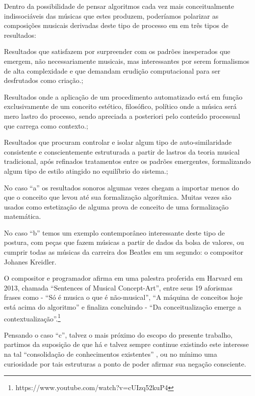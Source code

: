 \documentclass[
	12pt,				%
	openright,			%
	twoside,			%
	a4paper,			%
	english,			%
	french,				%
	spanish,			%
	brazil				%
	]{abntex2}
\begin{document}
Dentro da possibilidade de pensar algoritmos cada vez mais conceitualmente indissociáveis das músicas que estes produzem, poderíamos polarizar as composições musicais derivadas deste tipo de processo em em três tipos de resultados:

\begin{alineas}

\item Resultados que satisfazem por surpreender com os padrões inesperados que emergem, não necessariamente musicais, mas interessantes por serem formalismos de alta complexidade e que demandam erudição computacional para ser desfrutados como criação.;

\item Resultados onde a aplicação de um procedimento automatizado está em função exclusivamente de um conceito estético, filosófico, político onde a música será mero lastro do processo, sendo apreciada a posteriori pelo conteúdo processual que carrega como contexto.;

\item Resultados que procuram controlar e isolar algum tipo de auto-similaridade consistente e conscientemente estruturada a partir de lastros da teoria musical tradicional, após refinados tratamentos entre os padrões emergentes, formalizando algum tipo de estilo atingido no equilíbrio do sistema.;

\end{alineas}

No caso “a” os resultados sonoros algumas vezes chegam a importar menos do que o conceito que levou até sua formalização algorítmica. Muitas vezes são usados como estetização de alguma prova de conceito de uma formalização matemática.

No caso “b” temos um exemplo contemporâneo interessante deste tipo de postura, com peças que fazem  músicas a partir de dados da bolsa de valores, ou cumprir todas as músicas da carreira dos Beatles em um segundo: o compositor Johanes Kreidler. 

O compositor e programador afirma em uma palestra proferida em Harvard em 2013, chamada “Sentences of Musical Concept-Art”, entre seus 19 aforismas frases como - “Só é musica o que é não-musical”, “A máquina de conceitos hoje está acima do algoritmo” e finaliza concluindo - “Da conceitualização emerge a contextualização”.\footnote{https://www.youtube.com/watch?v=cUIzq52kuP4}

Pensando o caso “c”, talvez o mais próximo do escopo do presente trabalho, partimos da suposição de que há e talvez sempre continue existindo este interesse na tal  “consolidação  de conhecimentos existentes” \cite{iazzetta2009musica}, ou no mínimo uma curiosidade por tais estruturas a ponto de poder afirmar sua negação consciente. 
\end{document}
